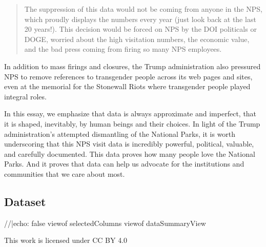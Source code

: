 \documentclass[
  letterpaper,
  DIV=11,
  numbers=noendperiod]{scrartcl}
\newenvironment{Shaded}{\begin{snugshade}}{\end{snugshade}}
\newcommand{\NormalTok}[1]{\textcolor[rgb]{0.00,0.23,0.31}{#1}}
\begin{document}
\begin{quote}
The suppression of this data would not be coming from anyone in the NPS,
which proudly displays the numbers every year (just look back at the
last 20 years!). This decision would be forced on NPS by the DOI
politicals or DOGE, worried about the high visitation numbers, the
economic value, and the bad press coming from firing so many NPS
employees.
\end{quote}

In addition to mass firings and closures, the Trump administration also
pressured NPS to remove references to transgender people across its web
pages and sites, even at the memorial for the Stonewall Riots where
transgender people played integral roles.~

In this essay, we emphasize that data is always approximate and
imperfect, that it is shaped, inevitably, by human beings and their
choices. In light of the Trump administration's attempted dismantling of
the National Parks, it is worth underscoring that this NPS visit data is
incredibly powerful, political, valuable, and carefully documented. This
data proves how many people love the National Parks. And it proves that
data can help us advocate for the institutions and communities that we
care about most.

\subsection{Dataset}\label{dataset}

\begin{tcolorbox}[enhanced jigsaw, arc=.35mm, opacitybacktitle=0.6, bottomrule=.15mm, left=2mm, toprule=.15mm, opacityback=0, colbacktitle=quarto-callout-note-color!10!white, colback=white, breakable, titlerule=0mm, bottomtitle=1mm, toptitle=1mm, title={View Summary of Columns}, coltitle=black, rightrule=.15mm, leftrule=.75mm, colframe=quarto-callout-note-color-frame]

\begin{Shaded}
\begin{Highlighting}[]
\NormalTok{//|echo: false}
\NormalTok{viewof selectedColumns}
\NormalTok{viewof dataSummaryView}
\end{Highlighting}
\end{Shaded}

\end{tcolorbox}

\begin{tcolorbox}[enhanced jigsaw, arc=.35mm, opacitybacktitle=0.6, bottomrule=.15mm, left=2mm, toprule=.15mm, opacityback=0, colbacktitle=quarto-callout-tip-color!10!white, colback=white, breakable, titlerule=0mm, bottomtitle=1mm, toptitle=1mm, title={Creative Commons License}, coltitle=black, rightrule=.15mm, leftrule=.75mm, colframe=quarto-callout-tip-color-frame]

This work is licensed under CC BY 4.0

\end{tcolorbox}
\end{document}

